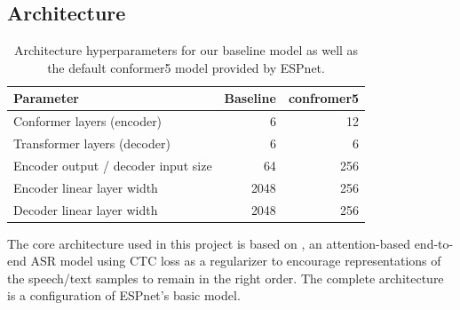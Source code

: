 \documentclass{article}
\begin{document}
  \subsection{Architecture} \label{architecture}
  \begin{table}
    \begin{center}
      \begin{tabular}{lrr}
        \toprule
        Parameter                           & Baseline & confromer5 \\\midrule
        Conformer layers (encoder)          & 6        & 12 \\
        Transformer layers (decoder)        & 6        & 6 \\
        Encoder output / decoder input size & 64       & 256 \\
        Encoder linear layer width          & 2048     & 256 \\
        Decoder linear layer width          & 2048     & 256 \\\bottomrule
      \end{tabular}
    \end{center}
    \caption{Architecture hyperparameters for our baseline model as well as the default conformer5 model provided by ESPnet.}
    \label{table-architecture-hyperparameters}
  \end{table}
  The core architecture used in this project is based on \cite{Kim}, an attention-based end-to-end ASR model using CTC loss as a regularizer to encourage representations of the speech/text samples to remain in the right order. The complete architecture is a configuration of ESPnet's basic model.
\end{document}

